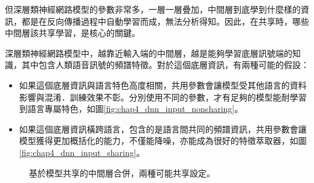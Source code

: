 但深層類神經網路模型的參數非常多，一層一層疊加，中間層到底學到什麼樣的資訊，都是在反向傳播過程中自動學習而成，無法分析得知。因此，在共享時，哪些中間層該共享學習，是核心的關鍵。

深層類神經網路模型中，越靠近輸入端的中間層，越是能夠學習底層訊號端的知識，其中包含人類語音訊號的頻譜特徵。對於這個底層資訊，有兩種可能的假設：
\begin{itemize}
 \itemsep -2pt
 \item 如果這個底層資訊與語言特色高度相關，共用參數會讓模型受其他語言的資料影響與混淆．訓練效果不彰。分別使用不同的參數，才有足夠的模型能耐學習到語言專屬特色，如圖\ref{fig:chap4_dnn_input_nonsharing}。
 \item 如果這個底層資訊橫跨語言，包含的是語言間共同的頻譜資訊，共用參數會讓模型獲得更加概括化的能力，不僅能降噪，亦能成為很好的特徵萃取器，如圖\ref{fig:chap4_dnn_input_sharing}。
\end{itemize}

\begin{figure}[!h]
\centering
{}
\caption{基於模型共享的中間層合併，兩種可能共享設定。}
\end{figure}

